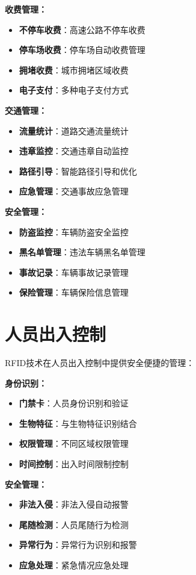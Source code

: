\documentclass[12pt,UTF8]{ctexbook}
\begin{document}
\begin{itemize}[leftmargin=3.5em]
\begin{itemize}[leftmargin=3.5em]
\begin{itemize}[leftmargin=3.5em]
\begin{itemize}[leftmargin=3.5em]
\textbf{收费管理：}
\begin{itemize}[leftmargin=3.5em]
    \item \textbf{不停车收费}：高速公路不停车收费
    \item \textbf{停车场收费}：停车场自动收费管理
    \item \textbf{拥堵收费}：城市拥堵区域收费
    \item \textbf{电子支付}：多种电子支付方式
\end{itemize}

\textbf{交通管理：}
\begin{itemize}[leftmargin=3.5em]
    \item \textbf{流量统计}：道路交通流量统计
    \item \textbf{违章监控}：交通违章自动监控
    \item \textbf{路径引导}：智能路径引导和优化
    \item \textbf{应急管理}：交通事故应急管理
\end{itemize}

\textbf{安全管理：}
\begin{itemize}[leftmargin=3.5em]
    \item \textbf{防盗监控}：车辆防盗安全监控
    \item \textbf{黑名单管理}：违法车辆黑名单管理
    \item \textbf{事故记录}：车辆事故记录管理
    \item \textbf{保险管理}：车辆保险信息管理
\end{itemize}

\section{人员出入控制}

RFID技术在人员出入控制中提供安全便捷的管理：

\textbf{身份识别：}
\begin{itemize}[leftmargin=3.5em]
    \item \textbf{门禁卡}：人员身份识别和验证
    \item \textbf{生物特征}：与生物特征识别结合
    \item \textbf{权限管理}：不同区域权限管理
    \item \textbf{时间控制}：出入时间限制控制
\end{itemize}

\textbf{安全管理：}
\begin{itemize}[leftmargin=3.5em]
    \item \textbf{非法入侵}：非法入侵自动报警
    \item \textbf{尾随检测}：人员尾随行为检测
    \item \textbf{异常行为}：异常行为识别和报警
    \item \textbf{应急处理}：紧急情况应急处理
\end{itemize}


\end{itemize}
\end{itemize}
\end{itemize}
\end{itemize}
\end{document}
